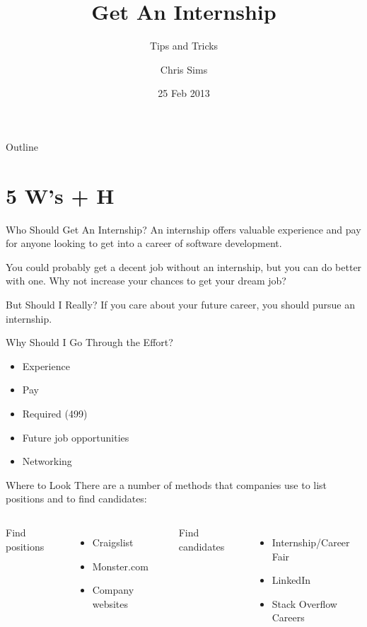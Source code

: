 \documentclass{beamer}
\title{Get An Internship}
\subtitle{Tips and Tricks}
\author{Chris Sims}
\date{25 Feb 2013}
\begin{document}
\frame{\titlepage}

\begin{frame}{Outline}
  \tableofcontents
\end{frame}


\section{5 W's + H}

\begin{frame}{Who Should Get An Internship?}
  An internship offers valuable experience and pay for anyone looking to get
  into a career of software development. \\
  \hfill

  You could probably get a decent job without an internship, but you can do
  better with one. Why not increase your chances to get your dream job? \\
  \hfill

  \begin{block}{But Should I Really?}
    If you care about your future career, you should pursue an internship.
  \end{block}
\end{frame}

\begin{frame}{Why Should I Go Through the Effort?}

  \begin{itemize}
    \item Experience
    \item Pay
    \item Required (499)
    \item Future job opportunities
    \item Networking
  \end{itemize}

\end{frame}


\begin{frame}{Where to Look}
  There are a number of methods that companies use to list positions and to
  find candidates: \\
  \vfill

  \begin{columns}[c]
      Find positions
      \begin{itemize}
        \item Craigslist
        \item Monster.com
        \item Company websites
      \end{itemize}

      Find candidates
      \begin{itemize}
        \item Internship/Career Fair
        \item LinkedIn
        \item Stack Overflow Careers
      \end{itemize}

  \end{columns}
\end{frame}
\end{document}
